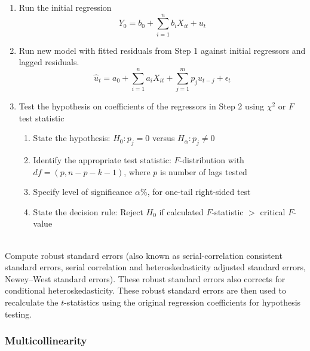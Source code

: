 \begin{definition} 
\begin{enumerate}[label=\arabic*.]
\setlength{\itemsep}{0pt}
\item Run the initial regression
\begin{equation}
Y_0 = b_0 + \sum\limits_{i=1}^n b_{i} X_{it} + u_t \nonumber
\end{equation}
\item Run new model with fitted residuals from Step 1 against initial regressors and lagged residuals.
\begin{equation}
\hat{u}_{t} = a_0 + \sum\limits_{i=1}^n a_{i} X_{it} + \sum\limits_{j=1}^m p_j u_{t-j} + \epsilon_t \nonumber
\end{equation}
\item Test the hypothesis on coefficients of the regressors in Step 2 using $\chi^2$ or $F$ test statistic
\begin{enumerate}[label=\roman*.]
\setlength{\itemsep}{0pt}
\item State the hypothesis: $H_0: p_j = 0$ versus $H_{\alpha}: p_j \neq 0$
\item Identify the appropriate test statistic: $F$-distribution with $df = (p, n-p-k-1)$, where $p$ is number of lags tested
\item Specify level of significance $\alpha \%$, for one-tail right-sided test
\item State the decision rule: Reject $H_0$ if calculated $F$-statistic $>$ critical $F$-value
\end{enumerate}
\end{enumerate}
\end{definition}

\begin{remark} \\
Compute robust standard errors (also known as serial-correlation consistent standard errors, serial correlation and heteroskedasticity adjusted standard errors, Newey–West standard errors). These robust standard errors also corrects for conditional heteroskedasticity. These robust standard errors are then used to recalculate the $t$-statistics using the original regression coefficients for hypothesis testing.
\end{remark}

\subsubsection{Multicollinearity}

